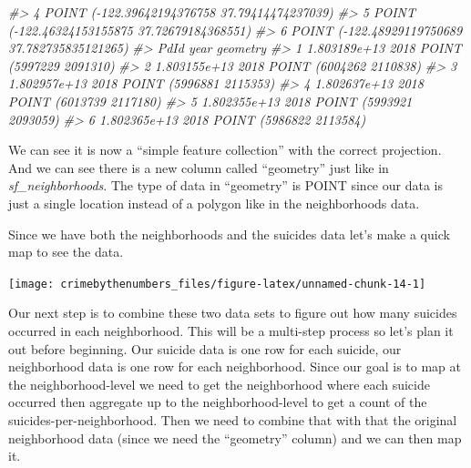 \documentclass[
]{krantz}
\makeatletter
\newenvironment{Shaded}{\begin{snugshade}}{\end{snugshade}}
\newcommand{\AttributeTok}[1]{\textcolor[rgb]{0.61,0.61,0.61}{#1}}
\newcommand{\CommentTok}[1]{\textcolor[rgb]{0.37,0.37,0.37}{\textit{#1}}}
\newcommand{\ConstantTok}[1]{\textcolor[rgb]{0,0,0}{#1}}
\newcommand{\FunctionTok}[1]{\textcolor[rgb]{0,0,0}{#1}}
\newcommand{\NormalTok}[1]{#1}
\newcommand{\SpecialCharTok}[1]{\textcolor[rgb]{0,0,0}{#1}}
\newcommand{\StringTok}[1]{\textcolor[rgb]{0.5,0.5,0.5}{#1}}
\newenvironment{kframe}{%
\medskip{}
\setlength{\fboxsep}{.8em}
 \def\at@end@of@kframe{}%
 \ifinner\ifhmode%
  \def\at@end@of@kframe{\end{minipage}}%
  \begin{minipage}{\columnwidth}%
 \fi\fi%
 \def\FrameCommand##1{\hskip\@totalleftmargin \hskip-\fboxsep
 \colorbox{shadecolor}{##1}\hskip-\fboxsep
     \hskip-\linewidth \hskip-\@totalleftmargin \hskip\columnwidth}%
 \MakeFramed {\advance\hsize-\width
   \@totalleftmargin\z@ \linewidth\hsize
   \@setminipage}}%
 {\par\unskip\endMakeFramed%
 \at@end@of@kframe}
\renewenvironment{Shaded}{\begin{kframe}}{\end{kframe}}
\makeatother
\begin{document}
\begin{Shaded}
\begin{Highlighting}[]
\CommentTok{\#\textgreater{} 4  POINT ({-}122.39642194376758 37.79414474237039)}
\CommentTok{\#\textgreater{} 5  POINT ({-}122.46324153155875 37.72679184368551)}
\CommentTok{\#\textgreater{} 6 POINT ({-}122.48929119750689 37.782735835121265)}
\CommentTok{\#\textgreater{}           PdId year                geometry}
\CommentTok{\#\textgreater{} 1 1.803189e+13 2018 POINT (5997229 2091310)}
\CommentTok{\#\textgreater{} 2 1.803155e+13 2018 POINT (6004262 2110838)}
\CommentTok{\#\textgreater{} 3 1.802957e+13 2018 POINT (5996881 2115353)}
\CommentTok{\#\textgreater{} 4 1.802637e+13 2018 POINT (6013739 2117180)}
\CommentTok{\#\textgreater{} 5 1.802355e+13 2018 POINT (5993921 2093059)}
\CommentTok{\#\textgreater{} 6 1.802365e+13 2018 POINT (5986822 2113584)}
\end{Highlighting}
\end{Shaded}

We can see it is now a ``simple feature collection'' with the correct projection. And we can see there is a new column called ``geometry'' just like in \emph{sf\_neighborhoods}. The type of data in ``geometry'' is POINT since our data is just a single location instead of a polygon like in the neighborhoods data.

Since we have both the neighborhoods and the suicides data let's make a quick map to see the data.

\begin{Shaded}
\end{Shaded}

\begin{center}\texttt{[image: crimebythenumbers\_files/figure-latex/unnamed-chunk-14-1]} \end{center}

Our next step is to combine these two data sets to figure out how many suicides occurred in each neighborhood. This will be a multi-step process so let's plan it out before beginning. Our suicide data is one row for each suicide, our neighborhood data is one row for each neighborhood. Since our goal is to map at the neighborhood-level we need to get the neighborhood where each suicide occurred then aggregate up to the neighborhood-level to get a count of the suicides-per-neighborhood. Then we need to combine that with that the original neighborhood data (since we need the ``geometry'' column) and we can then map it.
\end{document}
